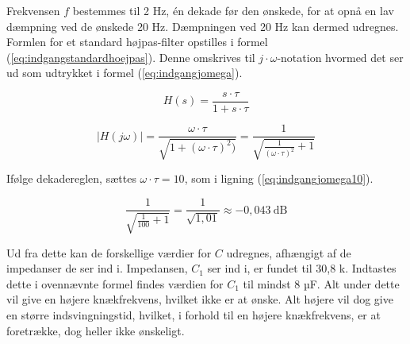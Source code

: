 Frekvensen $f$ bestemmes til 2 Hz, én dekade før den ønskede, for at opnå en lav dæmpning ved de ønskede 20 Hz. Dæmpningen ved 20 Hz kan dermed udregnes. Formlen for et standard højpas-filter opstilles i formel (\ref{eq:indgangstandardhoejpas}). Denne omskrives til $j\cdot\omega$-notation hvormed det ser ud som udtrykket i formel (\ref{eq:indgangjomega}).

\begin{equation}
\label{eq:indgangstandardhoejpas}
H(s)=\frac{s\cdot\tau}{1+s\cdot\tau}
\end{equation}

\begin{equation}
\label{eq:indgangjomega}
\left| H(j\omega) \right| = \frac{\omega\cdot\tau}{\sqrt{1+(\omega\cdot\tau)^2)}}=\frac{1}{\sqrt{\frac{1}{(\omega\cdot\tau)^2}+1}}
\end{equation}

Ifølge dekadereglen, sættes $\omega\cdot\tau = 10$, som i ligning (\ref{eq:indgangjomega10}).

\begin{equation}
\label{eq:indgangjomega10}
\frac{1}{\sqrt{\frac{1}{100}+1}}=\frac{1}{\sqrt{1,01}}\approx -0,043~\mathrm{dB}
\end{equation}

Ud fra dette kan de forskellige værdier for $C$ udregnes, afhængigt af de impedanser de ser ind i.
Impedansen, $C_1$ ser ind i, er fundet til 30,8 k\ohm . Indtastes dette i ovennævnte formel findes værdien for $C_1$ til mindst 8 µF. Alt under dette vil give en højere knækfrekvens, hvilket ikke er at ønske. Alt højere vil dog give en større indsvingningstid, hvilket, i forhold til en højere knækfrekvens, er at foretrække, dog heller ikke ønskeligt.


